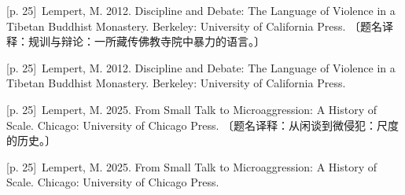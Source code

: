 \documentclass[10pt,a4paper]{article}
\begin{document}
\noindent\begin{minipage}{\textwidth}\begin{minipage}[t]{\dimexpr.5\textwidth-4mm\relax}\noindent\begin{minipage}[t]{\linewidth}{\scriptsize\color{gray} [p. 25]}\ Lempert, M. 2012. Discipline and Debate: The Language of Violence in a Tibetan Buddhist Monastery. Berkeley: University of California Press. 〔题名译释：规训与辩论：一所藏传佛教寺院中暴力的语言。〕\par\end{minipage}\par\end{minipage}\hfill\begin{minipage}[t]{\dimexpr.5\textwidth-4mm\relax}\noindent\begin{minipage}[t]{\linewidth}{\scriptsize\color{gray} [p. 25]}\ Lempert, M. 2012. Discipline and Debate: The Language of Violence in a Tibetan Buddhist Monastery. Berkeley: University of California Press.\par\end{minipage}\par\end{minipage}\end{minipage}\par
\noindent\begin{minipage}{\textwidth}\begin{minipage}[t]{\dimexpr.5\textwidth-4mm\relax}\noindent\begin{minipage}[t]{\linewidth}{\scriptsize\color{gray} [p. 25]}\ Lempert, M. 2025. From Small Talk to Microaggression: A History of Scale. Chicago: University of Chicago Press. 〔题名译释：从闲谈到微侵犯：尺度的历史。〕\par\end{minipage}\par\end{minipage}\hfill\begin{minipage}[t]{\dimexpr.5\textwidth-4mm\relax}\noindent\begin{minipage}[t]{\linewidth}{\scriptsize\color{gray} [p. 25]}\ Lempert, M. 2025. From Small Talk to Microaggression: A History of Scale. Chicago: University of Chicago Press.\par\end{minipage}\par\end{minipage}\end{minipage}\par
\end{document}
